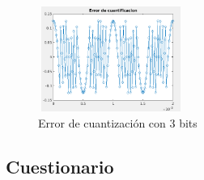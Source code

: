 \begin{figure}[H]
    \centering
    \includegraphics[height=130px, width=180px]{Imagenes/error.png}
    \caption{Error de cuantización con 3 bits}
    \label{fig:Error_de_cuantizacion_con_3_bits}
\end{figure}


\subsection{Cuestionario}

\noindent 

